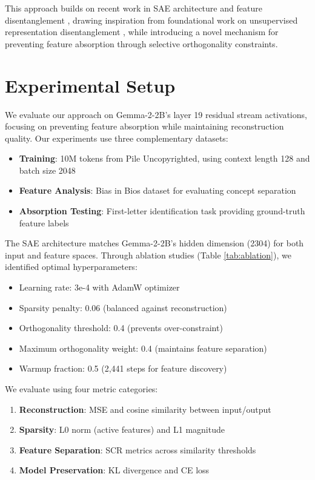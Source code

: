 \documentclass{article} %
\begin{document}
This approach builds on recent work in SAE architecture \cite{rajamanoharanJumpingAheadImproving2024} and feature disentanglement \cite{chaninAbsorptionStudyingFeature2024}, drawing inspiration from foundational work on unsupervised representation disentanglement \cite{Chen2016InfoGANIR}, while introducing a novel mechanism for preventing feature absorption through selective orthogonality constraints.

\section{Experimental Setup}
\label{sec:experimental}

We evaluate our approach on Gemma-2-2B's layer 19 residual stream activations, focusing on preventing feature absorption while maintaining reconstruction quality. Our experiments use three complementary datasets:

\begin{itemize}
\item \textbf{Training}: 10M tokens from Pile Uncopyrighted, using context length 128 and batch size 2048
\item \textbf{Feature Analysis}: Bias in Bios dataset \cite{de-arteagaBiasBiosCase2019} for evaluating concept separation
\item \textbf{Absorption Testing}: First-letter identification task \cite{chaninAbsorptionStudyingFeature2024} providing ground-truth feature labels
\end{itemize}

The SAE architecture matches Gemma-2-2B's hidden dimension (2304) for both input and feature spaces. Through ablation studies (Table \ref{tab:ablation}), we identified optimal hyperparameters:

\begin{itemize}
\item Learning rate: 3e-4 with AdamW optimizer
\item Sparsity penalty: 0.06 (balanced against reconstruction)
\item Orthogonality threshold: 0.4 (prevents over-constraint)
\item Maximum orthogonality weight: 0.4 (maintains feature separation)
\item Warmup fraction: 0.5 (2,441 steps for feature discovery)
\end{itemize}

We evaluate using four metric categories:
\begin{enumerate}
\item \textbf{Reconstruction}: MSE and cosine similarity between input/output
\item \textbf{Sparsity}: L0 norm (active features) and L1 magnitude
\item \textbf{Feature Separation}: SCR metrics across similarity thresholds
\item \textbf{Model Preservation}: KL divergence and CE loss
\end{enumerate}
\end{document}
